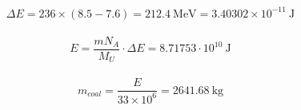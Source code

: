 \documentclass{article}
\newcommand{\si}[1]{\  \mathrm{#1}}
\begin{document}
\begin{equation*}
  \begin{aligned}
    \Delta E = 236 \times \left( 8.5 - 7.6 \right) = 212.4 \si{MeV} = 3.40302 \times 10^{-11} \si{J}
  \end{aligned}
\end{equation*}

\begin{equation*}
  \begin{aligned}
    E = \dfrac{m N_A}{M_U} \cdot \Delta E = 8.71753 \cdot 10^{10} \si{J}
  \end{aligned}
\end{equation*}

\begin{equation*}
  \begin{aligned}
    m_{coal} = \dfrac{E}{33 \times 10^6} =  2641.68 \si{kg}
  \end{aligned}
\end{equation*}
\end{document}
